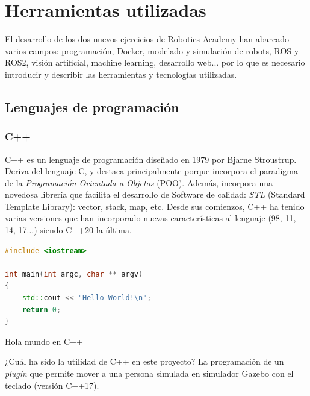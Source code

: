 \chapter{Herramientas utilizadas}
\label{cap:capitulo3}

El desarrollo de los dos nuevos ejercicios de Robotics Academy han abarcado varios campos: programación, Docker, modelado y simulación de robots, ROS y ROS2, visión artificial, machine learning, desarrollo web... por lo que es necesario introducir y describir las herramientas y tecnologías utilizadas.\\



\section{Lenguajes de programación}
\label{sec:lenguajes_programacion}


\subsection{C++}
\label{subsec:c++}

C++ \cite{c++} es un lenguaje de programación diseñado en 1979 por Bjarne Stroustrup. Deriva del lenguaje C, y destaca principalmente porque incorpora el paradigma de la \textit{Programación Orientada a Objetos} (POO). Además, incorpora una novedosa librería que facilita el desarrollo de Software de calidad: \textit{STL} (Standard Template Library): vector, stack, map, etc. Desde sus comienzos, C++ ha tenido varias versiones que han incorporado nuevas características al lenguaje (98, 11, 14, 17...) siendo C++20 la última.\\

\begin{code}[H]
\begin{lstlisting}[language=C++]
#include <iostream>

int main(int argc, char ** argv)
{
	std::cout << "Hello World!\n";
	return 0;
}
\end{lstlisting}
\caption[Hola mundo en C++]{Hola mundo en C++}
\label{cod:holamundo_cplusplus}
\end{code}

¿Cuál ha sido la utilidad de C++ en este proyecto? La programación de un \textit{plugin} que permite mover a una persona simulada en simulador Gazebo con el teclado (versión C++17).\\




